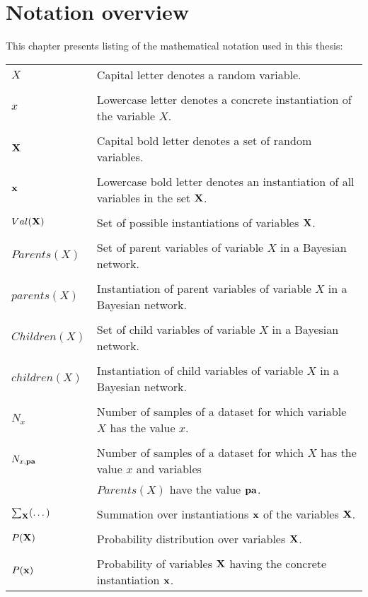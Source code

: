 \chapter{Notation overview}
This chapter presents listing of the mathematical notation used in this thesis:

\bigskip
\begin{tabular}{ll}
	$X$ & Capital letter denotes a random variable.\\
	&\\
	$x$ & Lowercase letter denotes a concrete instantiation of the variable $X$.\\
	&\\
	${\bold{X}}$ & Capital bold letter denotes a set of random variables.\\
	&\\
	${\bold{x}}$ & Lowercase bold letter denotes an instantiation of all variables in the set ${\bold{X}}$.\\
	&\\
	$Val({\bold{X}})$ & Set of possible instantiations of variables ${\bold{X}}$.\\
	&\\
	$Parents(X)$ & Set of parent variables of variable $X$ in a Bayesian network.\\
	&\\
	$parents(X)$ & Instantiation of parent variables of variable $X$ in a Bayesian network.\\
	&\\
	$Children(X)$ & Set of child variables of variable $X$ in a Bayesian network.\\
	&\\
	$children(X)$ & Instantiation of child variables of variable $X$ in a Bayesian network.\\
	&\\
	$N_x$ & Number of samples of a dataset for which variable $X$ has the value $x$.\\
	&\\
	$N_{x,{\bold{pa}}}$ & Number of samples of a dataset for which $X$ has the value $x$ and variables\\
	                  & $Parents(X)$ have the value ${\bold{pa}}$.\\
	&\\
	$\sum_{\bold{X}} (\dots)$ & Summation over instantiations ${\bold{x}}$ of the variables ${\bold{X}}$.\\
	&\\
	$P({\bold{X}})$ & Probability distribution over variables ${\bold{X}}$.\\
	&\\
	$P({\bold{x}})$ & Probability of variables ${\bold{X}}$ having the concrete instantiation ${\bold{x}}$.\\
\end{tabular}





